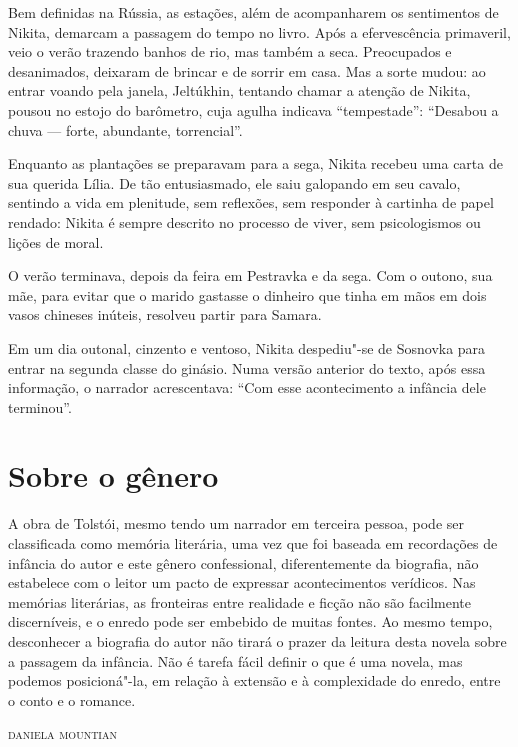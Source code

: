 Bem definidas na Rússia, as estações, além de acompanharem os
sentimentos de Nikita, demarcam a passagem do tempo no livro. Após a
efervescência primaveril, veio o verão trazendo banhos de rio, mas
também a seca. Preocupados e desanimados, deixaram de brincar e de
sorrir em casa. Mas a sorte mudou: ao entrar voando pela janela,
Jeltúkhin, tentando chamar a atenção de Nikita, pousou no estojo do
barômetro, cuja agulha indicava ``tempestade'': ``Desabou a chuva ---
forte, abundante, torrencial''.

Enquanto as plantações se preparavam para a sega, Nikita recebeu uma
carta de sua querida Lília. De tão entusiasmado, ele saiu galopando em
seu cavalo, sentindo a vida em plenitude, sem reflexões, sem responder à
cartinha de papel rendado: Nikita é sempre descrito no processo de
viver, sem psicologismos ou lições de moral.

O verão terminava, depois da feira em Pestravka e da sega. Com o outono,
sua mãe, para evitar que o marido gastasse o dinheiro que tinha em mãos
em dois vasos chineses inúteis, resolveu partir para Samara.

Em um dia outonal, cinzento e ventoso, Nikita despediu"-se de Sosnovka
para entrar na segunda classe do ginásio. Numa versão anterior do texto,
após essa informação, o narrador acrescentava: ``Com esse acontecimento
a infância dele terminou''.

\section{Sobre o gênero}\label{para3}

\noindent{}A obra de Tolstói, mesmo tendo um narrador em terceira pessoa, pode ser
classificada como memória literária, uma vez que foi baseada em
recordações de infância do autor e este gênero confessional,
diferentemente da biografia, não estabelece com o leitor um pacto de
expressar acontecimentos verídicos. Nas memórias literárias, as
fronteiras entre realidade e ficção não são facilmente discerníveis, e o
enredo pode ser embebido de muitas fontes. Ao mesmo tempo, desconhecer
a biografia do autor não tirará o prazer da leitura desta novela sobre a
passagem da infância. Não é tarefa fácil definir o que é uma novela, mas
podemos posicioná"-la, em relação à extensão e à complexidade do enredo,
entre o conto e o romance.

\vfill

\begin{flushleft}
\textsc{daniela mountian}
\end{flushleft}



